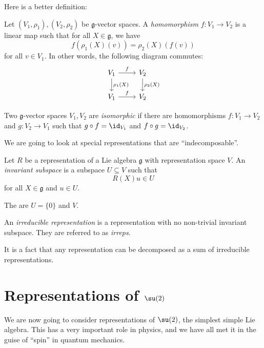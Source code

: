 \documentclass[a4paper]{article}
\begin{document}
\begin{own}
  Here is a better definition:
  \begin{defi}
    Let $(V_1, \rho_1), (V_2, \rho_2)$ be $\mathfrak{g}$-vector spaces. A \emph{homomorphism} $f: V_1 \to V_2$ is a linear map such that for all $X \in \mathfrak{g}$, we have
    \[
      f(\rho_1(X)(v)) = \rho_2(X)(f(v))
    \]
    for all $v \in V_1$. In other words, the following diagram commutes:
    \[
      \begin{tikzcd}
        V_1 \ar[r, "f"] \ar[d, "\rho_1(X)"] & V_2 \ar[d, "\rho_2(X)"]\\
        V_1 \ar[r, "f"] & V_2
      \end{tikzcd}
    \]
  \end{defi}

  \begin{defi}
    Two $\mathfrak{g}$-vector spaces $V_1, V_2$ are \emph{isomorphic} if there are homomorphisms $f: V_1 \to V_2$ and $g: V_2 \to V_1$ such that $g \circ f = \id_{V_1}$ and $f \circ g = \id_{V_2}$.
  \end{defi}
\end{own}

We are going to look at special representations that are ``indecomposable''.
\begin{defi}
  Let $R$ be a representation of a Lie algebra $\mathfrak{g}$ with representation space $V$. An \emph{invariant subspace} is a subspace $U \subseteq V$ such that
  \[
    R(X) u \in U
  \]
  for all $X \in \mathfrak{g}$ and $u \in U$.

  The  are $U = \{0\}$ and $V$.
\end{defi}

\begin{defi}
  An \emph{irreducible representation} is a representation with no non-trivial invariant subspace. They are referred to as \emph{irreps}.
\end{defi}

It is a fact that any representation can be decomposed as a sum of irreducible representations.

\section{Representations of \texorpdfstring{$\su(2)$}{su(2)}}
We are now going to consider representations of $\su(2)$, the simplest simple Lie algebra. This has a very important role in physics, and we have all met it in the guise of ``spin'' in quantum mechanics.
\end{document}
